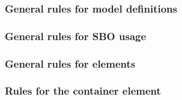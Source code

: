 \begin{sbmlenum}

\end{sbmlenum} \subsubsection*{General rules for model definitions} \begin{sbmlenum}


\end{sbmlenum} \subsubsection*{General rules for SBO usage} \begin{sbmlenum}


\end{sbmlenum} \subsubsection*{General rules for  elements} \begin{sbmlenum}


\end{sbmlenum} \subsubsection*{Rules for the  container element} \begin{sbmlenum}


\end{sbmlenum}
